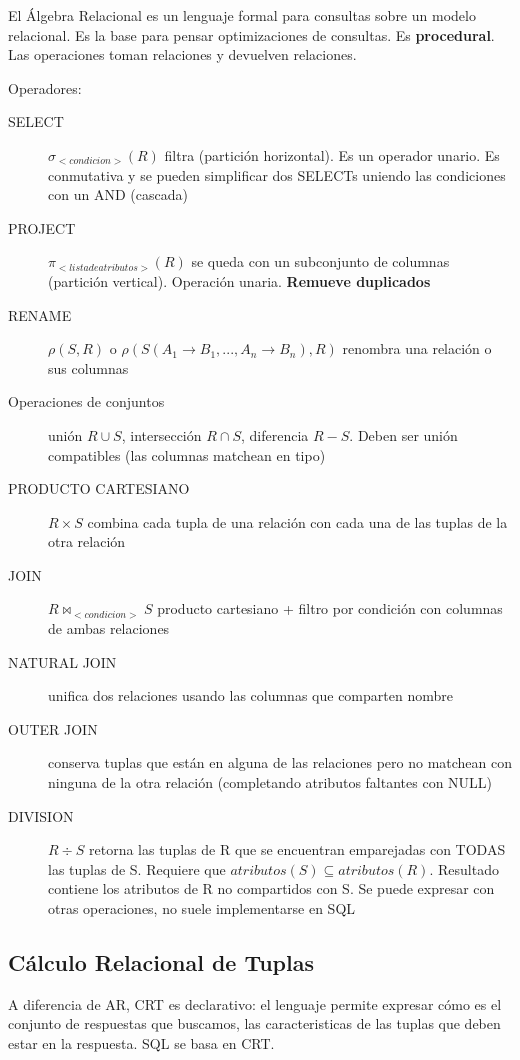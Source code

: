 El Álgebra Relacional es un lenguaje formal para consultas sobre un modelo relacional. Es la base para pensar optimizaciones de consultas. Es \textbf{procedural}. Las operaciones toman relaciones y devuelven relaciones.

Operadores:

\begin{description}
	\item[SELECT] $\sigma_{<condicion>}(R)$ filtra (partición horizontal). Es un operador unario. Es conmutativa y se pueden simplificar dos SELECTs uniendo las condiciones con un AND (cascada)
	\item[PROJECT] $\pi_{<lista de atributos>}(R)$ se queda con un subconjunto de columnas (partición vertical). Operación unaria. \textbf{Remueve duplicados}
	\item[RENAME] $\rho(S, R)$ o $\rho(S(A_1 \to B_1, ..., A_n \to B_n), R)$ renombra una relación o sus columnas
	\item[Operaciones de conjuntos] unión $R \cup S$, intersección $R \cap S$, diferencia $R - S$. Deben ser unión compatibles (las columnas matchean en tipo)
	\item[PRODUCTO CARTESIANO] $R \times S$ combina cada tupla de una relación
con cada una de las tuplas de la otra relación
	\item[JOIN] $R \bowtie_{<condicion>} S$ producto cartesiano + filtro por condición con columnas de ambas relaciones
	\item[NATURAL JOIN] unifica dos relaciones usando las columnas que comparten nombre
	\item[OUTER JOIN] conserva tuplas que están en alguna de las relaciones pero no matchean con ninguna de la otra relación (completando atributos faltantes con NULL)
	\item[DIVISION] $R \div S$ retorna las tuplas de R que se encuentran emparejadas con TODAS las tuplas de S. Requiere que $atributos(S) \subseteq atributos(R)$. Resultado contiene los atributos de R no compartidos con S. Se puede expresar con otras operaciones, no suele implementarse en SQL
\end{description}

\subsection{Cálculo Relacional de Tuplas}

A diferencia de AR, CRT es declarativo: el lenguaje permite expresar cómo es el conjunto de respuestas que
buscamos, las caracteristicas de las tuplas que deben estar en la respuesta. SQL se basa en CRT.

